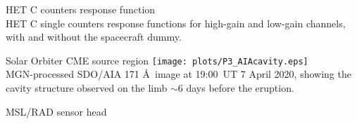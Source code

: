 \documentclass[10pt,aspectratio=169,usenames,dvipsnames]{beamer}
\begin{document}
\begin{frame}{HET C counters response function}
\centering
\scalebox{0.75}{}\\
HET C single counters response functions for high-gain and low-gain channels, with and without the spacecraft dummy.
\end{frame}

\begin{frame}{Solar Orbiter CME source region}
    \centering
    \texttt{[image: plots/P3\_AIAcavity.eps]}\\   
    MGN-processed SDO/AIA 171 \AA\ image at 19:00~UT 7 April 2020, showing the cavity structure observed on the limb  $\sim$6 days before the eruption.
\end{frame}

\begin{frame}{MSL/RAD sensor head}
    \centering
    
\end{frame}
\end{document}

